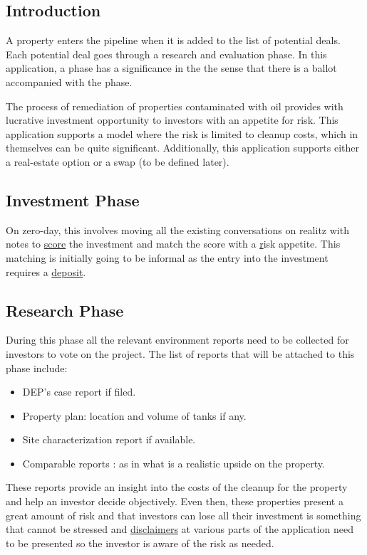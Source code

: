 \documentclass{article}
\begin{document}
\subsection{Introduction} \label {intro}
A property enters the pipeline when it is added to the list of potential deals. Each potential deal goes through a research and evaluation phase. In this application, a phase has a significance in the the sense that there is a ballot accompanied with the phase. 

The process of remediation of properties contaminated with oil provides with lucrative investment opportunity to investors with an appetite for risk. This application supports a model where the risk is limited to cleanup costs, which in themselves can be quite significant. Additionally, this application supports either a real-estate option or a swap (to be defined later).


\subsection{Investment Phase} \label {investment}
  On zero-day, this involves moving all the existing conversations on realitz with notes to \href {propertyscore}{score} the investment and match the score with a \href {riskprofile} risk appetite. This matching is initially going to be informal as the entry into the investment requires a \href{securitydeposit}{deposit}.

\subsection{Research Phase} \label {research}

  During this phase all the relevant environment reports need to be collected for investors to vote on the project. The list of reports that will be attached to this phase include: 
    \begin{itemize}
      \item DEP's case report if filed.
      \item Property plan: location and volume of tanks if any.
      \item Site characterization report if available.
      \item Comparable reports : as in what is a realistic upside on the property.
    \end{itemize}
  These reports provide an insight into the costs of the cleanup for the property and help an investor decide objectively. Even then, these properties present a great amount of risk and that investors can lose all their investment is something that cannot be stressed and  \href {disclaimerflow}{disclaimers} at various parts of the application need to be presented so the investor is aware of the risk as needed.
\end{document}
